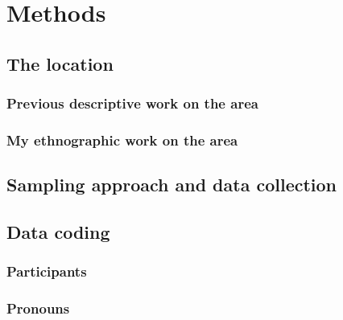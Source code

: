 \chapter{Methods}
  \section{The location}
    \subsection{Previous descriptive work on the area}
    \subsection{My ethnographic work on the area}
  \section{Sampling approach and data collection}
  \section{Data coding}
    \subsection{Participants}
    \subsection{Pronouns}




      









